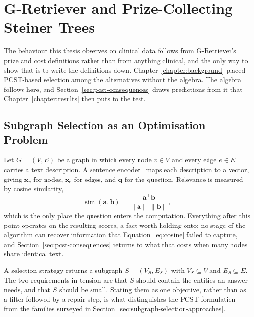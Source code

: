 \chapter{G-Retriever and Prize-Collecting Steiner Trees} \label{chapter:pcst}

The behaviour this thesis observes on clinical data follows from G-Retriever's
prize and cost definitions rather than from anything clinical, and the only way
to show that is to write the definitions down. Chapter~\ref{chapter:background}
placed PCST-based selection among the alternatives without the algebra. The
algebra follows here, and Section~\ref{sec:pcst-consequences} draws predictions
from it that Chapter~\ref{chapter:results} then puts to the test.

\section{Subgraph Selection as an Optimisation Problem} \label{sec:selection-formal}

Let $G = (V, E)$ be a graph in which every node $v \in V$ and every edge
$e \in E$ carries a text description. A sentence encoder~\cite{reimers2019sentencebert}
maps each description to a vector, giving $\mathbf{x}_v$ for nodes,
$\mathbf{x}_e$ for edges, and $\mathbf{q}$ for the question. Relevance is
measured by cosine similarity,
%
\begin{equation}
\operatorname{sim}(\mathbf{a}, \mathbf{b})
  = \frac{\mathbf{a}^{\top}\mathbf{b}}{\lVert \mathbf{a}\rVert \, \lVert \mathbf{b}\rVert},
\label{eq:cosine}
\end{equation}
%
which is the only place the question enters the computation. Everything after
this point operates on the resulting scores, a fact worth holding onto: no stage
of the algorithm can recover information that Equation~\ref{eq:cosine} failed to
capture, and Section~\ref{sec:pcst-consequences} returns to what that costs when
many nodes share identical text.

A selection strategy returns a subgraph $S = (V_S, E_S)$ with $V_S \subseteq V$
and $E_S \subseteq E$. The two requirements in tension are that $S$ should
contain the entities an answer needs, and that $S$ should be small. Stating them
as one objective, rather than as a filter followed by a repair step, is what
distinguishes the PCST formulation from the families surveyed in
Section~\ref{sec:subgraph-selection-approaches}.

